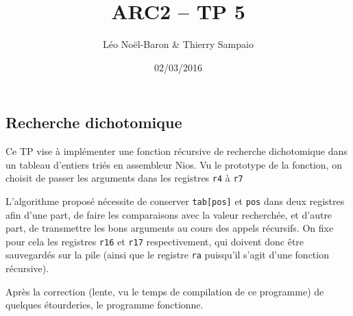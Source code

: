 \documentclass[a4paper,11pt]{article}
\title{ARC2 -- TP 5}
\author{Léo Noël-Baron \& Thierry Sampaio}
\date{02/03/2016}
\begin{document}
\maketitle

\subsection*{Recherche dichotomique}

Ce TP vise à implémenter une fonction récursive de recherche dichotomique dans un tableau d'entiers triés en assembleur Nios. Vu le prototype de la fonction, on choisit de passer les arguments dans les registres \verb?r4? à \verb?r7?

L'algorithme proposé nécessite de conserver \verb?tab[pos]? et \verb?pos? dans deux registres afin d'une part, de faire les comparaisons avec la valeur recherchée, et d'autre part, de transmettre les bons arguments au cours des appels récursifs. On fixe pour cela les registres \verb?r16? et \verb?r17? respectivement, qui doivent donc être sauvegardés sur la pile (ainsi que le registre \verb?ra? puisqu'il s'agit d'une fonction récursive).

Après la correction (lente, vu le temps de compilation de ce programme) de quelques étourderies, le programme fonctionne.
\end{document}
